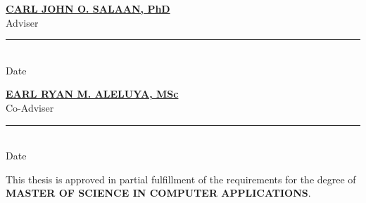 \vspace{0.3cm}
\begin{center}
	\begin{minipage}{0.54\textwidth}
		\begin{center}
			\textbf{\underline{\MakeUppercase{Carl John O. Salaan}, PhD}}\\
			\vspace{0.1cm}
			Adviser\\
			\vspace{0.2cm}
			\rule{4.5cm}{0.5pt}\\
			\vspace{-0.3cm}
			Date
		\end{center}
	\end{minipage}
	\hfill
	\begin{minipage}{0.45\textwidth}
		\begin{center}
			\textbf{\underline{\MakeUppercase{Earl Ryan M. Aleluya}, MSc}}\\
			\vspace{0.2cm}
			Co-Adviser\\
			\vspace{0.2cm}
			\rule{4.5cm}{0.5pt}\\
			\vspace{-0.3cm}
			Date
		\end{center}
	\end{minipage}
\end{center}

\begin{adjustwidth}{25pt}{-12pt}
	\begin{singlespace}
		\setlength{\marginparsep}{0pt}
		\setlength{\textwidth}{410pt}
		This thesis is approved in partial fulfillment of the requirements for the degree of \textbf{MASTER OF SCIENCE IN COMPUTER APPLICATIONS}.
	\end{singlespace}
\end{adjustwidth}


